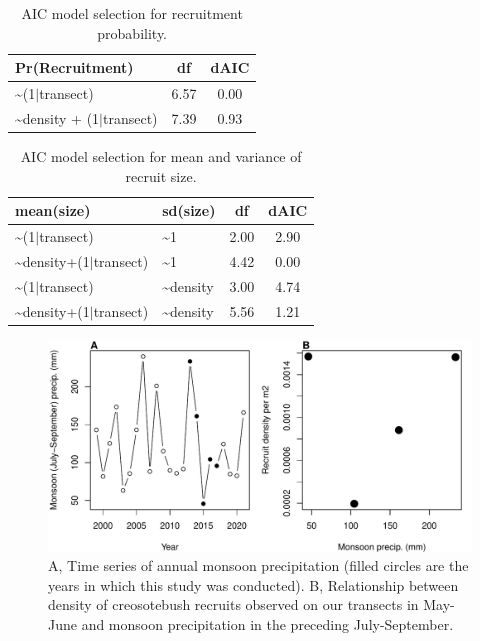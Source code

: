 \documentclass[11pt]{article}\usepackage[]{graphicx}\usepackage[usenames,dvipsnames]{xcolor}
\begin{document}
\begin{table}[ht]
\centering
\begin{tabular}{|p{8cm}|c|c|}
  \hline
Pr(Recruitment) & df & dAIC \\ 
  \hline
\~{}(1$|$transect) & 6.57 & 0.00 \\ 
  \~{}density + (1$|$transect) & 7.39 & 0.93 \\ 
   \hline
\end{tabular}
\caption{AIC model selection for recruitment probability.} 
\label{tab:recruit_aic}
\end{table}


\begin{table}[ht]
\centering
\begin{tabular}{|p{8cm}|p{4cm}|c|c|}
  \hline
mean(size) & sd(size) & df & dAIC \\ 
  \hline
\~{}(1$|$transect) & \~{}1 & 2.00 & 2.90 \\ 
  \~{}density+(1$|$transect) & \~{}1 & 4.42 & 0.00 \\ 
  \~{}(1$|$transect) & \~{}density & 3.00 & 4.74 \\ 
  \~{}density+(1$|$transect) & \~{}density & 5.56 & 1.21 \\ 
   \hline
\end{tabular}
\caption{AIC model selection for mean and variance of recruit size.} 
\label{tab:recruitsize_aic}
\end{table}


\newpage
\begin{figure}[H]
  \begin{center}
    \includegraphics[width=\linewidth]{Figures/monsoon_seedlings}
  \caption{A, Time series of annual monsoon precipitation (filled circles are the years in which this study was conducted). B, Relationship between density of creosotebush recruits observed on our transects in May-June and monsoon precipitation in the preceding July-September.}
  \label{fig:monsoon}
  \end{center}
\end{figure}
\end{document}
